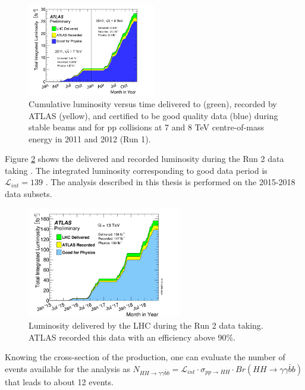 \begin{figure}[htbp]
    \centering
    \includegraphics[width=0.5\textwidth]{Ch2/Img/LumiRun1.png}
    \caption{Cumulative luminosity versus time delivered to (green), recorded by ATLAS (yellow), and certified to be good quality data (blue) during stable beams and for pp collisions at 7 and 8 TeV centre-of-mass energy in 2011 and 2012 (Run 1).}
    \label{fig:chap2:LHC:Lumi:Run1}
\end{figure}
Figure \ref{fig:chap2:LHC:Lumi} shows the delivered and recorded luminosity during the Run 2 data taking \cite{Lumi2018}. The integrated luminosity corresponding to good data period is $\mathcal{L}_{int} = 139 $ \ifb. The analysis described in this thesis is performed on the 2015-2018 data subsets.\\
\begin{figure}[htbp]
    \centering
    \includegraphics[width=0.6\textwidth]{Ch2/Img/Lumi.png}
    \caption{Luminosity delivered by the LHC during the Run 2 data taking. ATLAS recorded this data with an efficiency above 90\%.}
    \label{fig:chap2:LHC:Lumi}
\end{figure}
Knowing the cross-section of the \HHyybb production, one can evaluate the number of events available for the analysis as $N_{HH\rightarrow\gamma\gamma\bar{b}b} = \mathcal{L}_{int}\cdot\sigma_{pp\rightarrow HH}\cdot Br(HH\rightarrow\gamma\gamma\bar{b}b)$ that leads to about 12 events.

